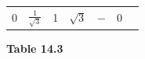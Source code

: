 {\begin{center}
\begin{xtabular*}{\mytablewidth}[t]{|p{10\mystarwidth}|p{10\mystarwidth}|p{10\mystarwidth}|p{10\mystarwidth}|p{10\mystarwidth}|p{10\mystarwidth}|p{10\mystarwidth}|}
    
        0 &
    
    
        
                \begin{math}\frac{1}{\sqrt{3}}\end{math}
               &
    
    
        1 &
    
    
        
                \begin{math}\sqrt{3}\end{math}
               &
    
    
        
                \begin{math}-\end{math}
               &
    
    
        0%
     \tabularnewline{}
    \end{xtabular*}
      \end{center}
    \begin{center}{\small\bfseries Table 14.3}\end{center}
    
    \addtocounter{footnote}{-0}
    
        }%
      
